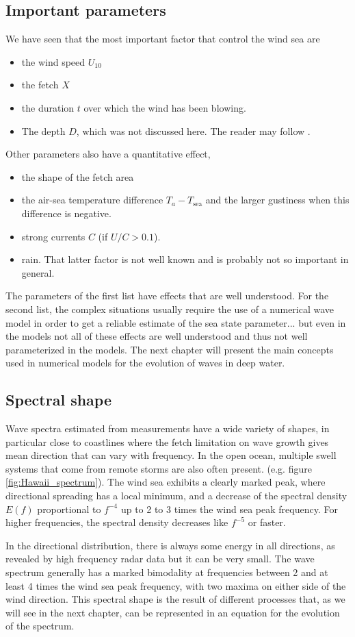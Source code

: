 \subsection{Important parameters}
 We have seen that the most important factor that control the wind sea are 
\begin{itemize}
  \item the wind speed $U_{10}$
  \item the fetch  $X$
  \item the duration $t$ over which the wind has been blowing.
 \item The depth $D$, which was not discussed here. The reader may follow \cite{Young1999}. 
 \end{itemize}
Other parameters also have a quantitative effect, 
\begin{itemize}
  \item the shape of the fetch area 
  \item the air-sea temperature difference $T_a - T_{\mathrm{sea}}$ and the larger gustiness when this difference is negative. 
  \item strong currents $C$ (if $U/C > 0.1$).
  \item rain. That latter factor is not well known and is probably not so important in general. 
\end{itemize}

The parameters of the first list have effects that are well understood. For the second list, the complex situations usually require 
the use of a numerical wave model in order to get a reliable estimate of the sea state parameter... but even in the models 
not all of these effects are well understood and thus not well parameterized in the models. The next chapter will present 
the main concepts used in numerical models for the evolution of waves in deep water. 

\subsection{Spectral shape}
Wave spectra estimated from measurements have a wide variety of shapes, in particular close to coastlines 
where the fetch limitation on wave growth gives mean direction that can vary with frequency. 
In the open ocean, multiple swell systems that come from remote storms are also often present.  (e.g. figure \ref{fig:Hawaii_spectrum}). 
The wind sea exhibits a clearly marked peak, where directional spreading has a local minimum, and a decrease of the spectral density $E(f)$ 
proportional to  $f^{-4}$ up to 2 to 3 times the wind sea peak frequency. For higher frequencies, the spectral density decreases like $f^{-5}$ or faster. 

In the directional distribution, there is always some energy in all directions, as revealed by high frequency radar data \citep[e.g.][]{Barrick&al.1974,Tyler&al.1974}
 but it can be very 
small. The wave spectrum generally has a marked bimodality at frequencies between 2 and at least 4 times the wind sea peak frequency, with two maxima on either side of the wind 
direction. This spectral shape is the result of different processes that, as we will see in the next chapter, can be represented in an equation for the evolution of the spectrum. 
